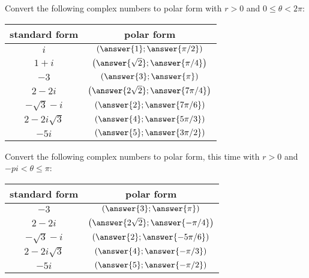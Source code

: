 \documentclass[space,nooutcomes]{ximera}
\begin{document}
\begin{problem}
Convert the following complex numbers to polar form with $r>0$ and $0\le\theta < 2\pi$:
\begin{center}
\begin{tabular}{c | c}
standard form & polar form \\
\hline
  $i$ & $\left( \answer{1}; \answer{\pi/2} \right)$ \\
 $1 + i$  & $\left( \answer{\sqrt{2}}; \answer{\pi/4} \right)$ \\
 $-3$ & $\left( \answer{3}; \answer{\pi} \right)$ \\
 $2 - 2i$ & $\left( \answer{2\sqrt{2}}; \answer{7\pi/4} \right)$ \\
 $-\sqrt{3}-i$ & $\left( \answer{2}; \answer{7\pi/6} \right)$ \\
 $2 - 2i\sqrt{3}$ & $\left( \answer{4}; \answer{5\pi/3} \right)$ \\
 $-5i$ & $\left( \answer{5}; \answer{3\pi/2} \right)$ \\
 \end{tabular}
\end{center}
\end{problem}

\begin{problem}
Convert the following complex numbers to polar form, this time with $r>0$ and $-pi < \theta \le \pi$:
\begin{center}
\begin{tabular}{c | c}
standard form & polar form \\
\hline
 $-3$ & $\left( \answer{3}; \answer{\pi} \right)$ \\
 $2 - 2i$ & $\left( \answer{2\sqrt{2}}; \answer{-\pi/4} \right)$ \\
 $-\sqrt{3}-i$ & $\left( \answer{2}; \answer{-5\pi/6} \right)$ \\
 $2 - 2i\sqrt{3}$ & $\left( \answer{4}; \answer{-\pi/3} \right)$ \\
 $-5i$ & $\left( \answer{5}; \answer{-\pi/2} \right)$ \\
 \end{tabular}
\end{center}
\end{problem}
\end{document}
